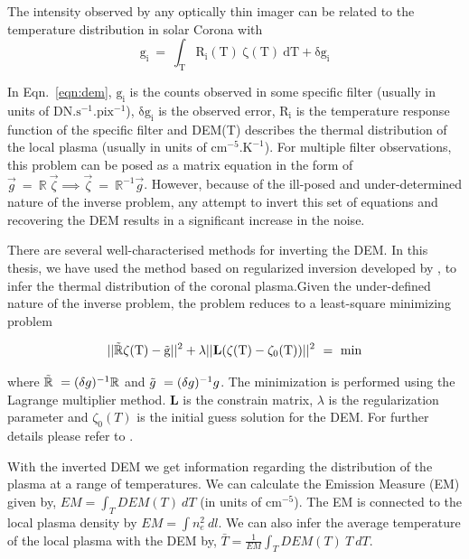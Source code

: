 {The intensity observed by any optically thin imager can be related to the temperature distribution in solar Corona with 
\begin{equation}
    \mathrm{g_{i}~=~\int_{T}R_{i}(T)~\zeta(T)~dT+\delta g_{i}}
    \label{eqn:dem}
\end{equation}

In Eqn.~\ref{eqn:dem}, $\mathrm{g_{i}}$ is the counts observed in some specific filter (usually in units of $\mathrm{DN.s^{-1}.pix^{-1}}$), $\mathrm{\delta g_{i}}$ is the observed error, $\mathrm{R_{i}}$ is the temperature response function of the specific filter and DEM(T) describes the thermal distribution of the local plasma  (usually in units of $\mathrm{cm^{-5}.K^{-1}}$). For multiple filter observations, this problem can be posed as a matrix equation in the form of $\Vec{g}~=~\mathbb{R}~\Vec{\zeta}\implies \Vec{\zeta}~=~\mathbb{R}^{-1}\Vec{g}$. However, because of the ill-posed and under-determined nature of the inverse problem, any attempt to invert this set of equations and recovering the DEM results in a significant increase in the noise.

There are several well-characterised methods for inverting the DEM. In this thesis, we have used the method based on regularized inversion developed by \cite{hannah&kontar12}, to infer the thermal distribution of the coronal plasma.Given the under-defined nature of the inverse problem, the problem reduces to a least-square minimizing problem

\begin{equation}
    \mathrm{||\Tilde{\mathbb{R}}\zeta(T)-\Tilde{g}||^{2}+\lambda||{\bf L}(\zeta(T)-\zeta_{0}(T))||^{2}~=~min}
    \label{eqn:dem}
\end{equation}

where $\Tilde{\mathbb{R}}~=(\delta g)^{-1}\mathbb{R}$ and $\Tilde{g}~=(\delta g)^{-1} g$. The minimization is performed using the Lagrange multiplier method. {\bf L} is the constrain matrix, $\lambda$ is the regularization parameter and $\zeta_{0}(T)$ is the initial guess solution for the DEM. For further details please refer to \cite{hannah&kontar12}.

With the inverted DEM we get information regarding the distribution of the plasma at a range of temperatures. We can calculate the Emission Measure (EM) given by, $EM=\int_{T}DEM(T)~dT$ (in units of $\mathrm{cm^{-5}}$). The EM is connected to the local plasma density by $EM=\int n_{e}^{2}~dl$. We can also infer the average temperature of the local plasma with the DEM by, $\bar{T}=\frac{1}{EM}\int_{T}DEM(T)~T~dT$.

}
